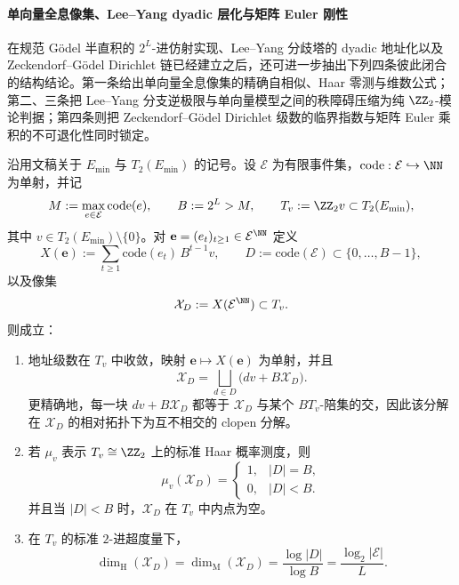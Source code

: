 \paragraph{单向量全息像集、Lee--Yang dyadic 层化与矩阵 Euler 刚性}
在规范 Gödel 半直积的 \(2^L\)-进仿射实现、Lee--Yang 分歧塔的 dyadic 地址化以及 Zeckendorf--Gödel Dirichlet 链已经建立之后，还可进一步抽出下列四条彼此闭合的结构结论。第一条给出单向量全息像集的精确自相似、Haar 零测与维数公式；第二、三条把 Lee--Yang 分支逆极限与单向量模型之间的秩障碍压缩为纯 \(\ZZ_2\)-模论判据；第四条则把 Zeckendorf--Gödel Dirichlet 级数的临界指数与矩阵 Euler 乘积的不可退化性同时锁定。

\begin{conclusion}\label{con:xi-time-part62b-rankone-hologram-selfsimilar-measure-dimension}
沿用文稿关于 \(E_{\min}\) 与 \(T_2(E_{\min})\) 的记号。设 \(\mathcal E\) 为有限事件集，\(\mathrm{code}:\mathcal E\hookrightarrow \NN\) 为单射，并记
\[
M:=\max_{e\in\mathcal E}\mathrm{code}(e),
\qquad
B:=2^L>M,
\qquad
T_v:=\ZZ_2v\subset T_2(E_{\min}),
\]
其中 \(v\in T_2(E_{\min})\setminus\{0\}\)。对 \(\mathbf e=(e_t)_{t\ge 1}\in\mathcal E^{\NN}\) 定义
\[
X(\mathbf e):=\sum_{t\ge 1}\mathrm{code}(e_t)\,B^{t-1}v,
\qquad
D:=\mathrm{code}(\mathcal E)\subset\{0,\dots,B-1\},
\]
以及像集
\[
\mathcal X_D:=X(\mathcal E^{\NN})\subset T_v.
\]
则成立：
\begin{enumerate}
  \item 地址级数在 \(T_v\) 中收敛，映射 \(\mathbf e\mapsto X(\mathbf e)\) 为单射，并且
  \[
  \mathcal X_D=\bigsqcup_{d\in D}\bigl(dv+B\mathcal X_D\bigr).
  \]
  更精确地，每一块 \(dv+B\mathcal X_D\) 都等于 \(\mathcal X_D\) 与某个 \(B T_v\)-陪集的交，因此该分解在 \(\mathcal X_D\) 的相对拓扑下为互不相交的 clopen 分解。
  \item 若 \(\mu_v\) 表示 \(T_v\cong \ZZ_2\) 上的标准 Haar 概率测度，则
  \[
  \mu_v(\mathcal X_D)=
  \begin{cases}
  1,& |D|=B,\\
  0,& |D|<B.
  \end{cases}
  \]
  并且当 \(|D|<B\) 时，\(\mathcal X_D\) 在 \(T_v\) 中内点为空。
  \item 在 \(T_v\) 的标准 \(2\)-进超度量下，
  \[
  \dim_{\mathrm H}(\mathcal X_D)
  =
  \dim_{\mathrm M}(\mathcal X_D)
  =
  \frac{\log |D|}{\log B}
  =
  \frac{\log_2|\mathcal E|}{L}.
  \]
\end{enumerate}
\end{conclusion}

